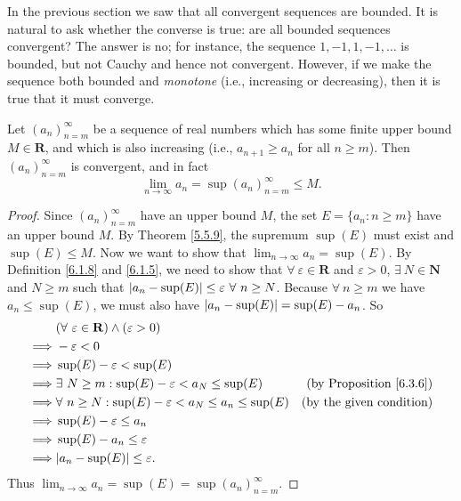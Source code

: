 \begin{note}
    In the previous section we saw that all convergent sequences are bounded.
    It is natural to ask whether the converse is true:
    are all bounded sequences convergent?
    The answer is no;
    for instance, the sequence \(1, -1, 1, -1, \dots\) is bounded, but not Cauchy and hence not convergent.
    However, if we make the sequence both bounded and \emph{monotone} (i.e., increasing or decreasing), then it is true that it must converge.
\end{note}

\begin{proposition}\label{6.3.8}
    Let \((a_n)_{n = m}^\infty\) be a sequence of real numbers which has some finite upper bound \(M \in \mathbf{R}\), and which is also increasing (i.e., \(a_{n + 1} \geq a_n\) for all \(n \geq m\)).
    Then \((a_n)_{n = m}^\infty\) is convergent, and in fact
    \[
        \lim_{n \to \infty} a_n = \sup(a_n)_{n = m}^\infty \leq M.
    \]
\end{proposition}

\begin{proof}
    Since \((a_n)_{n = m}^\infty\) have an upper bound \(M\), the set \(E = \{a_n : n \geq m\}\) have an upper bound \(M\).
    By Theorem \ref{5.5.9}, the supremum \(\sup(E)\) must exist and \(\sup(E) \leq M\).
    Now we want to show that \(\lim_{n \to \infty} a_n = \sup(E)\).
    By Definition \ref{6.1.8} and \ref{6.1.5}, we need to show that \(\forall\ \varepsilon \in \mathbf{R}\) and \(\varepsilon > 0\), \(\exists\ N \in \mathbf{N}\) and \(N \geq m\) such that \(\abs*{a_n - \sup(E)} \leq \varepsilon \ \forall\ n \geq N\).
    Because \(\forall\ n \geq m\) we have \(a_n \leq \sup(E)\), we must also have \(\abs*{a_n - \sup(E)} = \sup(E) - a_n\).
    So
    \begin{align*}
                 & (\forall\ \varepsilon \in \mathbf{R}) \land (\varepsilon > 0)                                               \\
        \implies & -\varepsilon < 0                                                                                            \\
        \implies & \sup(E) - \varepsilon < \sup(E)                                                                             \\
        \implies & \exists\ N \geq m : \sup(E) - \varepsilon < a_N \leq \sup(E)          & \text{(by Proposition \ref{6.3.6})} \\
        \implies & \forall\ n \geq N : \sup(E) - \varepsilon < a_N \leq a_n \leq \sup(E) & \text{(by the given condition)}     \\
        \implies & \sup(E) - \varepsilon \leq a_n                                                                              \\
        \implies & \sup(E) - a_n \leq \varepsilon                                                                              \\
        \implies & \abs*{a_n - \sup(E)} \leq \varepsilon.
    \end{align*}
    Thus \(\lim_{n \to \infty} a_n = \sup(E) = \sup(a_n)_{n = m}^\infty\).
\end{proof}

